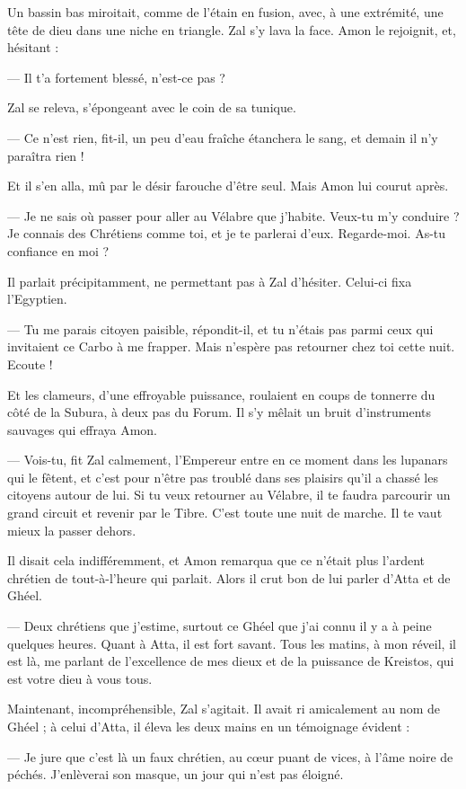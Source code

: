 \documentclass[a4paper, 11pt, oneside, polutonikogreek, french]{article}
\begin{document}
Un bassin bas miroitait, comme de l'étain en fusion, avec, à une extrémité, une tête de dieu dans une niche en triangle. Zal s'y lava la face. Amon le rejoignit, et, hésitant :

--- Il t'a fortement blessé, n'est-ce pas ?

Zal se releva, s'épongeant avec le coin de sa tunique.

--- Ce n'est rien, fit-il, un peu d'eau fraîche étanchera le sang, et demain il n'y paraîtra rien !

Et il s'en alla, mû par le désir farouche d'être seul. Mais Amon lui courut après.

--- Je ne sais où passer pour aller au Vélabre que j'habite. Veux-tu m'y conduire ? Je connais des Chrétiens comme toi, et je te parlerai d'eux. Regarde-moi. As-tu confiance en moi ?

Il parlait précipitamment, ne permettant pas à Zal d'hésiter. Celui-ci fixa l'Egyptien.

--- Tu me parais citoyen paisible, répondit-il, et tu n'étais pas parmi ceux qui invitaient ce Carbo à me frapper. Mais n'espère pas retourner chez toi cette nuit. Ecoute !

Et les clameurs, d'une effroyable puissance, roulaient en coups de tonnerre du côté de la Subura, à deux pas du Forum. Il s'y mêlait un bruit d'instruments sauvages qui effraya Amon.

--- Vois-tu, fit Zal calmement, l'Empereur entre en ce moment dans les lupanars qui le fêtent, et c'est pour n'être pas troublé dans ses plaisirs qu'il a chassé les citoyens autour de lui. Si tu veux retourner au Vélabre, il te faudra parcourir un grand circuit et revenir par le Tibre. C'est toute une nuit de marche. Il te vaut mieux la passer dehors.

Il disait cela indifféremment, et Amon remarqua que ce n'était plus l'ardent chrétien de tout-à-l'heure qui parlait. Alors il crut bon de lui parler d'Atta et de Ghéel.

--- Deux chrétiens que j'estime, surtout ce Ghéel que j'ai connu il y a à peine quelques heures. Quant à Atta, il est fort savant. Tous les matins, à mon réveil, il est là, me parlant de l'excellence de mes dieux et de la puissance de Kreistos, qui est votre dieu à vous tous.

Maintenant, incompréhensible, Zal s'agitait. Il avait ri amicalement au nom de Ghéel ; à celui d'Atta, il éleva les deux mains en un témoignage évident :

--- Je jure que c'est là un faux chrétien, au cœur puant de vices, à l'âme noire de péchés. J'enlèverai son masque, un jour qui n'est pas éloigné.
\end{document}
